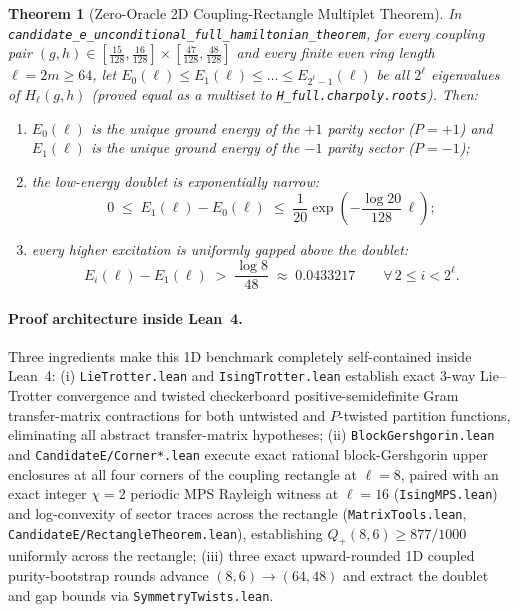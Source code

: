 \documentclass[11pt,a4paper]{article}
\newcommand{\id}[1]{{\small\nolinkurl{#1}}}
\newtheorem{theorem}{Theorem}[section]
\begin{document}
\begin{theorem}[Zero-Oracle 2D Coupling-Rectangle Multiplet Theorem]
\label{thm:candE}
In \id{candidate_e_unconditional_full_hamiltonian_theorem}, for every coupling pair $(g, h) \in [\frac{15}{128}, \frac{16}{128}] \times [\frac{47}{128}, \frac{48}{128}]$ and every finite even ring length $\ell = 2m \ge 64$, let $E_0(\ell) \le E_1(\ell) \le \dots \le E_{2^\ell - 1}(\ell)$ be all $2^\ell$ eigenvalues of $H_\ell(g, h)$ (proved equal as a multiset to \id{H_full.charpoly.roots}). Then:
\begin{enumerate}[leftmargin=1.8em,itemsep=2pt]
  \item $E_0(\ell)$ is the unique ground energy of the $+1$ parity sector ($P = +1$) and $E_1(\ell)$ is the unique ground energy of the $-1$ parity sector ($P = -1$);
  \item the low-energy doublet is exponentially narrow:
  \[
    0 \;\le\; E_1(\ell) - E_0(\ell) \;\le\; \frac{1}{20} \exp\!\left(-\frac{\log 20}{128}\,\ell\right);
  \]
  \item every higher excitation is uniformly gapped above the doublet:
  \[
    E_i(\ell) - E_1(\ell) \;>\; \frac{\log 8}{48} \;\approx\; 0.0433217 \qquad \forall\, 2 \le i < 2^\ell.
  \]
\end{enumerate}
\end{theorem}

\paragraph{Proof architecture inside Lean~4.}
Three ingredients make this 1D benchmark completely self-contained inside Lean~4:
(i) \id{LieTrotter.lean} and \id{IsingTrotter.lean} establish exact 3-way Lie--Trotter convergence and twisted checkerboard positive-semidefinite Gram transfer-matrix contractions for both untwisted and $P$-twisted partition functions, eliminating all abstract transfer-matrix hypotheses;
(ii) \id{BlockGershgorin.lean} and \id{CandidateE/Corner*.lean} execute exact rational block-Gershgorin upper enclosures at all four corners of the coupling rectangle at $\ell = 8$, paired with an exact integer $\chi = 2$ periodic MPS Rayleigh witness at $\ell = 16$ (\id{IsingMPS.lean}) and log-convexity of sector traces across the rectangle (\id{MatrixTools.lean}, \id{CandidateE/RectangleTheorem.lean}), establishing $Q_+(8, 6) \ge 877/1000$ uniformly across the rectangle;
(iii) three exact upward-rounded 1D coupled purity-bootstrap rounds advance $(8, 6) \to (64, 48)$ and extract the doublet and gap bounds via \id{SymmetryTwists.lean}.
\end{document}
